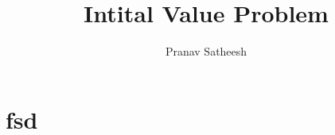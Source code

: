 \documentclass[10pt,a4paper]{article}
\author{Pranav Satheesh}
\title{Intital Value Problem}
\begin{document}
\maketitle


\section{fsd}
\end{document}
